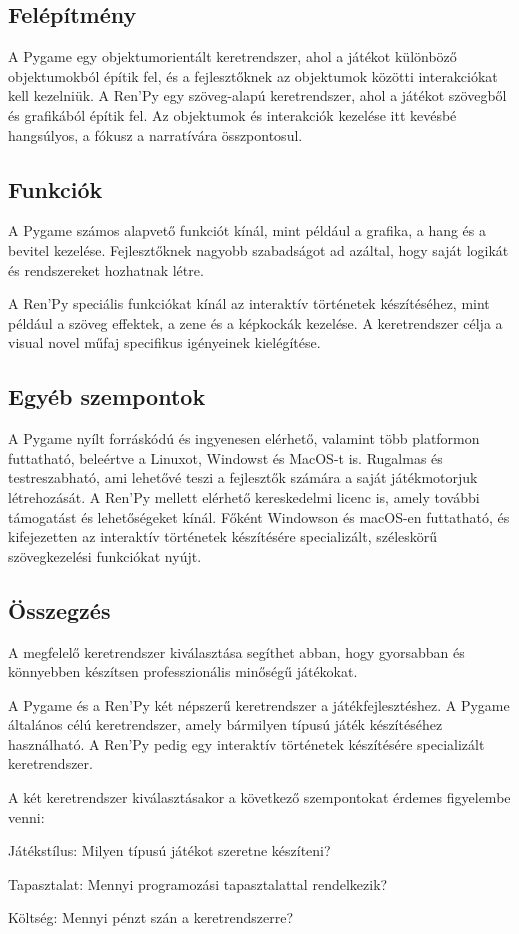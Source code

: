 \subsection{Felépítmény}

\indent \indent A Pygame egy objektumorientált keretrendszer, ahol a játékot különböző objektumokból építik fel, és a fejlesztőknek az objektumok közötti interakciókat kell kezelniük.
A Ren'Py egy szöveg-alapú keretrendszer, ahol a játékot szövegből és grafikából építik fel. Az objektumok és interakciók kezelése itt kevésbé hangsúlyos, a fókusz a narratívára összpontosul.

\subsection{Funkciók}

\indent \indent A Pygame számos alapvető funkciót kínál, mint például a grafika, a hang és a bevitel kezelése. Fejlesztőknek nagyobb szabadságot ad azáltal, hogy saját logikát és rendszereket hozhatnak létre.

A Ren'Py speciális funkciókat kínál az interaktív történetek készítéséhez, mint például a szöveg effektek, a zene és a képkockák kezelése. A keretrendszer célja a visual novel műfaj specifikus igényeinek kielégítése.

\subsection{Egyéb szempontok}

\indent \indent A Pygame nyílt forráskódú és ingyenesen elérhető, valamint több platformon futtatható, beleértve a Linuxot, Windowst és MacOS-t is. Rugalmas és testreszabható, ami lehetővé teszi a fejlesztők számára a saját játékmotorjuk létrehozását.
A Ren'Py mellett elérhető kereskedelmi licenc is, amely további támogatást és lehetőségeket kínál. Főként Windowson és macOS-en futtatható, és kifejezetten az interaktív történetek készítésére specializált, széleskörű szövegkezelési funkciókat nyújt.

\subsection{Összegzés}
\indent \indent A megfelelő keretrendszer kiválasztása segíthet abban, hogy gyorsabban és könnyebben készítsen professzionális minőségű játékokat.

A Pygame és a Ren'Py két népszerű keretrendszer a játékfejlesztéshez. A Pygame általános célú keretrendszer, amely bármilyen típusú játék készítéséhez használható. A Ren'Py pedig egy interaktív történetek készítésére specializált keretrendszer.

A két keretrendszer kiválasztásakor a következő szempontokat érdemes figyelembe venni:

Játékstílus: Milyen típusú játékot szeretne készíteni?

Tapasztalat: Mennyi programozási tapasztalattal rendelkezik?

Költség: Mennyi pénzt szán a keretrendszerre?


